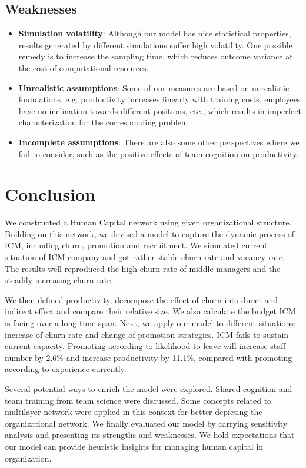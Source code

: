 \documentclass[tcn = 37075, sheet = false, abstract = false]{mcmthesis}
\begin{document}
	\subsection{Weaknesses}
	\begin{itemize}
		\item \textbf{Simulation volatility}: Although our model has nice statistical properties, results generated by different simulations suffer high volatility. One possible remedy is to increase the sampling time, which reduces outcome variance at the cost of computational resources.
		
		\item \textbf{Unrealistic assumptions}: Some of our measures are based on unrealistic foundations, e.g. productivity increases linearly with training costs, employees have no inclination towards different positions, etc., which results in imperfect characterization for the corresponding problem.
		
		\item \textbf{Incomplete assumptions}: There are also some other perspectives where we fail to consider, such as the positive effects of team cognition on productivity. 
	\end{itemize}
	
	
	\section{Conclusion}
	
	We constructed a Human Capital network using given organizational structure. Building on this network, we devised a model to capture the dynamic process of ICM, including churn, promotion and recruitment. We simulated current situation of ICM company and got rather stable churn rate and vacancy rate. The results well reproduced the high churn rate of middle managers and the steadily increasing churn rate.
	
	We then defined productivity, decompose the effect of churn into direct and indirect effect and compare their relative size. We also calculate the budget ICM is facing over a long time span. Next, we apply our model to different situations: increase of churn rate and change of promotion strategies. ICM fails to sustain current capacity. Promoting according to likelihood to leave will increase staff number by 2.6\% and increase productivity by 11.1\%, compared with promoting according to experience currently.
	
	Several potential ways to enrich the model were explored. Shared cognition and team training from team science were discussed. Some concepts related to multilayer network were applied in this context for better depicting the organizational network. We finally evaluated our model by carrying sensitivity analysis and presenting
	its strengths and weaknesses. We hold expectations that our model can provide heuristic insights for managing human capital in organization.
	
	
	
	
\end{document}

